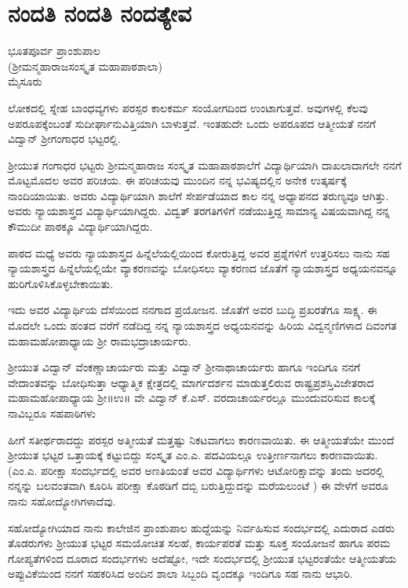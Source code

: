 {\fontsize{14}{16}\selectfont
\chapter{ನಂದತಿ ನಂದತಿ ನಂದತ್ಯೇವ}                           

\begin{center}
\smallskip

ಭೂತಪೂರ್ವ ಪ್ರಾಂಶುಪಾಲ\\
(ಶ್ರೀಮನ್ಮಹಾರಾಜಸಂಸ್ಕೃತ  ಮಹಾಪಾಠಶಾಲಾ)\\
ಮೈಸೂರು
\addrule
\end{center}
ಲೋಕದಲ್ಲಿ ಸ್ನೇಹ ಬಾಂಧವ್ಯಗಳು ಪರಸ್ಪರ ಕಾಲಕರ್ಮ ಸಂಯೋಗದಿಂದ ಉಂಟಾಗುತ್ತವೆ. ಅವುಗಳಲ್ಲಿ ಕೆಲವು ಅಪರೂಪಕ್ಕೆಂಬಂತೆ ಸುದೀರ್ಘಾನುವಿತ್ತಿಯಾಗಿ ಬಾಳುತ್ತವೆ. ಇಂತಹುದೇ ಒಂದು ಅಪರೂಪದ ಆತ್ಮೀಯತೆ ನನಗೆ ವಿದ್ವಾನ್ ಶ್ರೀಗಂಗಾಧರ ಭಟ್ಟರಲ್ಲಿ. 

ಶ್ರೀಯುತ ಗಂಗಾಧರ ಭಟ್ಟರು ಶ್ರೀಮನ್ಮಹಾರಾಜ ಸಂಸ್ಕೃತ ಮಹಾಪಾಠಶಾಲೆಗೆ ವಿದ್ಯಾರ್ಥಿಯಾಗಿ ದಾಖಲಾದಾಗಲೇ ನನಗೆ ಮೊಟ್ಟಮೊದಲ ಅವರ ಪರಿಚಯ. ಈ ಪರಿಚಯವು ಮುಂದಿನ ನನ್ನ ಭವಿಷ್ಯದಲ್ಲಿನ ಅನೇಕ ಉತ್ಕರ್ಷಕ್ಕೆ ನಾಂದಿಯಾಯಿತು.  ಅವರು ವಿದ್ಯಾರ್ಥಿಯಾಗಿ ಶಾಲೆಗೆ ಸೇರ್ಪಡೆಯಾದ ಕಾಲ ನನ್ನ ಅಧ್ಯಾಪನದ ತರುಣ್ಯವೂ ಆಗಿತ್ತು. ಅವರು ನ್ಯಾಯಶಾಸ್ತ್ರದ ವಿದ್ಯಾರ್ಥಿಯಾಗಿದ್ದರು. ವಿದ್ವತ್ ತರಗತಿಗಳಿಗೆ ನಡೆಯುತ್ತಿದ್ದ ಸಾಮಾನ್ಯ ವಿಷಯವಾಗಿದ್ದ ನನ್ನ ಕೌಮುದೀ ಪಾಠಕ್ಕೂ ವಿದ್ಯಾರ್ಥಿಯಾಗಿದ್ದರು.

ಪಾಠದ ಮಧ್ಯೆ ಅವರು ನ್ಯಾಯಶಾಸ್ತ್ರದ ಹಿನ್ನೆಲೆಯಲ್ಲಿಯಿಂದ ಕೋರುತ್ತಿದ್ದ ಅವರ ಪ್ರಶ್ನೆಗಳಿಗೆ ಉತ್ತರಿಸಲು ನಾನು ಸಹ ನ್ಯಾಯಶಾಸ್ತ್ರದ ಹಿನ್ನೆಲೆಯಲ್ಲಿಯೇ ವ್ಯಾಕರಣವನ್ನು ಬೋಧಿಸಲು ವ್ಯಾಕರಣದ ಜೊತೆಗೆ ನ್ಯಾಯಶಾಸ್ತ್ರದ ಅಧ್ಯಯನವನ್ನೂ ಹುರಿಗೊಳಿಸಿಕೊಳ್ಳಬೇಕಾಯಿತು. 

ಇದು ಅವರ ವಿದ್ಯಾರ್ಥಿಯ ದೆಸೆಯಿಂದ ನನಗಾದ ಪ್ರಯೋಜನ. ಜೊತೆಗೆ ಅವರ ಬುದ್ಧಿ ಪ್ರಖರತೆಗೂ ಸಾಕ್ಷ್ಯ. ಈ ಮೊದಲೇ ಒಂದು ಹಂತದ ವರೆಗೆ ನಡೆದಿದ್ದ ನನ್ನ ನ್ಯಾಯಶಾಸ್ತ್ರದ ಅಧ್ಯಯನವನ್ನು ಹಿರಿಯ ವಿದ್ವನ್ಮಣಿಗಳಾದ ದಿವಂಗತ ಮಹಾಮಹೋಪಾಧ್ಯಾಯ ಶ್ರೀ ರಾಮಭದ್ರಾಚಾರ್ಯರು.

ಶ್ರೀಯುತ ವಿದ್ವಾನ್ ವೆಂಕಣ್ಣಾಚಾರ್ಯರು ಮತ್ತು ವಿದ್ವಾನ್ ಶ್ರೀನಾಥಾಚಾರ್ಯರು ಹಾಗೂ ಇಂದಿಗೂ ನನಗೆ ವೇದಾಂತವನ್ನು ಬೋಧಿಸುತ್ತಾ ಆಧ್ಯಾತ್ಮಿಕ ಕ್ಷೇತ್ರದಲ್ಲಿ ಮಾರ್ಗದರ್ಶನ ಮಾಡುತ್ತಲಿರುವ ರಾಷ್ಟ್ರಪ್ರಶಸ್ತಿವಿಜೇತರಾದ ಮಹಾಮಹೋಪಾಧ್ಯಾಯ ಶ್ರೀ॥ಉ॥ ವೇ ವಿದ್ವಾನ್ ಕೆ.ಎಸ್. ವರದಾಚಾರ್ಯರಲ್ಲೂ ಮುಂದುವರಿಸುವ ಕಾಲಕ್ಕೆ ನಾವಿಬ್ಬರೂ ಸಹಪಾಠಿಗಳು

ಹೀಗೆ ಸತೀರ್ಥರಾದದ್ದು ಪರಸ್ಪರ ಅತ್ಮೀಯತೆ ಮತ್ತಷ್ಟು ನಿಕಟವಾಗಲು ಕಾರಣವಾಯಿತು. ಈ ಆತ್ಮೀಯತೆಯೇ ಮುಂದೆ ಶ್ರೀಯುತ ಭಟ್ಟರ ಒತ್ತಾಯಕ್ಕೆ ಕಟ್ಟುಬಿದ್ದು ಸಂಸ್ಕೃತ ಎಂ.ಎ. ಪದವಿಯಲ್ಲೂ ಉತ್ತೀರ್ಣನಾಗಲು ಕಾರಣವಾಯಿತು. (ಎಂ.ಎ. ಪರೀಕ್ಷಾ ಸಂದರ್ಭದಲ್ಲಿ ಅವರ ಅಣತಿಯಂತೆ ಅವರ ವಿದ್ಯಾರ್ಥಿಗಳು ಆಟೋರಿಕ್ಷಾವನ್ನು ತಂದು ಅದರಲ್ಲಿ ನನ್ನನ್ನು ಬಲವಂತವಾಗಿ ಕೂರಿಸಿ ಪರೀಕ್ಷಾ ಕೊಠಡಿಗೆ ದಬ್ಬಿ ಬರುತ್ತಿದ್ದುದನ್ನು ಮರೆಯಲುಂಟೆ ) ಈ ವೇಳೆಗೆ ಅವರೂ ನಾನು ಸಹೋದ್ಯೋಗಿಗಳಾದೆವು. 

ಸಹೋದ್ಯೋಗಿಯಾದ ನಾನು ಕಾಲೇಜಿನ ಪ್ರಾಂಶುಪಾಲ ಹುದ್ದೆಯನ್ನು ನಿರ್ವಹಿಸುವ ಸಂದರ್ಭದಲ್ಲಿ ಎದುರಾದ ಎಡರು ತೊಡರುಗಳು ಶ್ರೀಯುತ ಭಟ್ಟರ ಸಮಯೋಚಿತ ಸಲಹೆ, ಕಾರ್ಯಪರತೆ ಮತ್ತು ಸೂಕ್ತ ಸಂಯೋಜನೆ ಹಾಗೂ ಪರಮ ಗೋಪ್ಯತೆಗಳಿಂದ ದೂರಾದ ಸಂದರ್ಭಗಳು ಅದೆಷ್ಟೋ, ಇದೇ ಸಂದರ್ಭದಲ್ಲಿ ಶ್ರೀಯುತ ಭಟ್ಟರಂತೆಯೇ ಆತ್ಮೀಯತೆಯ ಅಪ್ಪುವಿಕೆಯಿಂದ ನನಗೆ ಸಹಕರಿಸಿದ ಅಂದಿನ ಶಾಲಾ ಸಿಬ್ಬಂದಿ ವೃಂದಕ್ಕೂ ಇಂದಿಗೂ ಸಹ ನಾನು ಆಭಾರಿ. 

}

